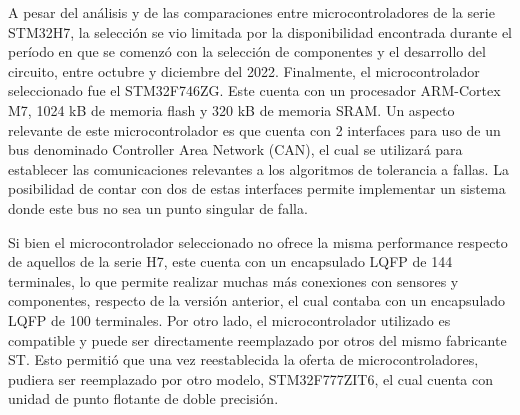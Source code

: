A pesar del análisis y de las comparaciones entre microcontroladores de la serie STM32H7, la selección se vio limitada por la disponibilidad encontrada durante el período en que se comenzó con la selección de componentes y el desarrollo del circuito, entre octubre y diciembre del 2022. %
Finalmente, el microcontrolador seleccionado fue el STM32F746ZG. Este cuenta con un procesador ARM-Cortex M7, 1024 kB de memoria flash y 320 kB de memoria SRAM. Un aspecto relevante de este microcontrolador es que cuenta con 2 interfaces para uso de un bus denominado Controller Area Network (CAN), el cual se utilizará para establecer las comunicaciones relevantes a los algoritmos de tolerancia a fallas. La posibilidad de contar con dos de estas interfaces permite implementar un sistema donde este bus no sea un punto singular de falla.

Si bien el microcontrolador seleccionado no ofrece la misma performance respecto de aquellos de la serie H7, este cuenta con un encapsulado LQFP de 144 terminales, lo que permite realizar muchas más conexiones con sensores y componentes, respecto de la versión anterior, el cual contaba con un encapsulado LQFP de 100 terminales. Por otro lado, el microcontrolador utilizado es compatible y puede ser directamente reemplazado por otros del mismo fabricante ST. Esto permitió que una vez reestablecida la oferta de microcontroladores, pudiera ser reemplazado por otro modelo, STM32F777ZIT6, el cual cuenta con unidad de punto flotante de doble precisión.







